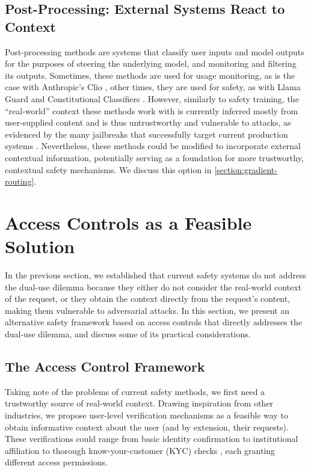 \documentclass{article}
\theoremstyle{plain}
\theoremstyle{definition}
\theoremstyle{remark}
\begin{document}
\subsection{Post-Processing: External Systems React to Context}

Post-processing methods are systems that classify user inputs and model outputs for the purposes of steering the underlying model, and monitoring and filtering its outputs.
Sometimes, these methods are used for usage monitoring, as is the case with Anthropic's Clio \cite{tamkin2024clioprivacypreservinginsightsrealworld, handa2025economictasksperformedai}, other times, they are used for safety, as with Llama Guard \cite{inan2023llamaguardllmbasedinputoutput} and Constitutional Classifiers \cite{sharma2025constitutionalclassifiersdefendinguniversal}.
However, similarly to safety training, the ``real-world'' context these methods work with is currently inferred mostly from user-supplied content and is thus untrustworthy and vulnerable to attacks, as evidenced by the many jailbreaks that successfully target current production systems \cite{zhang2025outputconstraintsattacksurface}.
Nevertheless, these methods could be modified to incorporate external contextual information, potentially serving as a foundation for more trustworthy, contextual safety mechanisms. We discuss this option in \cref{section:gradient-routing}.

\section{Access Controls as a Feasible Solution}
\label{section:access-controls}

In the previous section, we established that current safety systems
do not address the dual-use dilemma because they either do not
consider the real-world context of the request, or they obtain the
context directly from the request's content, making them vulnerable
to adversarial attacks. In this section, we present an alternative
safety framework based on access controls that directly addresses the
dual-use dilemma, and discuss some of its practical considerations.

\subsection{The Access Control Framework}

Taking note of the problems of current safety methods, we first need
a trustworthy source of real-world context. Drawing inspiration from
other industries, we propose user-level verification mechanisms as a
feasible way to obtain informative context about the user (and by
extension, their requests). These verifications could range from
basic identity confirmation to institutional affiliation to thorough
know-your-customer (KYC) checks \cite{FATF2025}, each granting
different access permissions.
\end{document}
